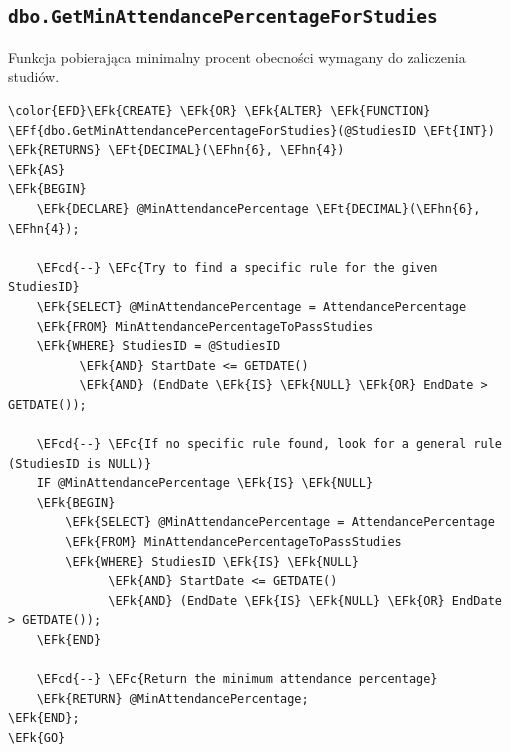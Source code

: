 \documentclass[11pt]{article}
\newcommand{\EFc}[1]{\textcolor{EFc}{\textit{#1}}} %
\newcommand{\EFcd}[1]{\textcolor{EFcd}{\textit{#1}}} %
\newcommand{\EFk}[1]{\textcolor{EFk}{\textbf{#1}}} %
\newcommand{\EFf}[1]{\textcolor{EFf}{#1}} %
\newcommand{\EFt}[1]{\textcolor{EFt}{\textbf{#1}}} %
\newcommand{\EFhn}[1]{\textcolor{EFhn}{#1}} %
\begin{document}
\subsection{\texttt{dbo.GetMinAttendancePercentageForStudies}}
\label{sec:org7e29ef8}
Funkcja pobierająca minimalny procent obecności wymagany do zaliczenia studiów.
\begin{Code}
\begin{Verbatim}
\color{EFD}\EFk{CREATE} \EFk{OR} \EFk{ALTER} \EFk{FUNCTION} \EFf{dbo.GetMinAttendancePercentageForStudies}(@StudiesID \EFt{INT})
\EFk{RETURNS} \EFt{DECIMAL}(\EFhn{6}, \EFhn{4})
\EFk{AS}
\EFk{BEGIN}
    \EFk{DECLARE} @MinAttendancePercentage \EFt{DECIMAL}(\EFhn{6}, \EFhn{4});

    \EFcd{--} \EFc{Try to find a specific rule for the given StudiesID}
    \EFk{SELECT} @MinAttendancePercentage = AttendancePercentage
    \EFk{FROM} MinAttendancePercentageToPassStudies
    \EFk{WHERE} StudiesID = @StudiesID
          \EFk{AND} StartDate <= GETDATE()
          \EFk{AND} (EndDate \EFk{IS} \EFk{NULL} \EFk{OR} EndDate > GETDATE());

    \EFcd{--} \EFc{If no specific rule found, look for a general rule (StudiesID is NULL)}
    IF @MinAttendancePercentage \EFk{IS} \EFk{NULL}
    \EFk{BEGIN}
        \EFk{SELECT} @MinAttendancePercentage = AttendancePercentage
        \EFk{FROM} MinAttendancePercentageToPassStudies
        \EFk{WHERE} StudiesID \EFk{IS} \EFk{NULL}
              \EFk{AND} StartDate <= GETDATE()
              \EFk{AND} (EndDate \EFk{IS} \EFk{NULL} \EFk{OR} EndDate > GETDATE());
    \EFk{END}

    \EFcd{--} \EFc{Return the minimum attendance percentage}
    \EFk{RETURN} @MinAttendancePercentage;
\EFk{END};
\EFk{GO}
\end{Verbatim}
\end{Code}
\end{document}
